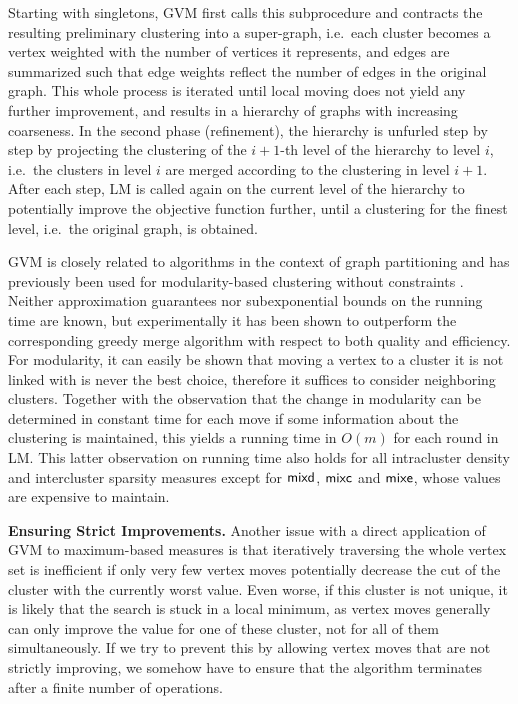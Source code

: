 \documentclass{llncs}
\newcommand{\measure}[1]{\ensuremath{\text{\normalfont{\sffamily {#1}}}}\xspace}
\newcommand{\andreapar}{\vspace*{.5ex}\par\noindent}
\begin{document}
Starting with singletons, GVM first calls this subprocedure and contracts the resulting preliminary clustering into a super-graph, i.e.~each cluster becomes a vertex weighted with the number of vertices it represents, and edges are summarized such that edge weights reflect the number of edges in the original graph.
This whole process is iterated until local moving does not yield any further improvement, and results in a hierarchy of graphs with increasing coarseness.
In the second phase (refinement), the hierarchy is unfurled step by step by projecting the clustering of the $i+1$-th level of the hierarchy to level $i$, i.e.~the clusters in level $i$ are merged according to the clustering in level $i+1$.
After each step, LM is called again on the current level of the hierarchy to potentially improve the objective function further, until a clustering for the finest level, i.e.~the original graph, is obtained.  
\par
GVM is closely related to algorithms in the context of graph partitioning and has previously been used for modularity-based clustering without constraints \cite{bgll-f-08,rn-m-11}. 
Neither approximation guarantees nor subexponential bounds on the running time are known, but experimentally it has been shown to outperform the corresponding greedy merge algorithm with respect to both quality and efficiency.
For modularity, it can easily be shown that moving a vertex to a cluster it is not linked with is never the best choice, therefore it suffices to consider neighboring clusters.
Together with the observation that the change in modularity can be determined in constant time for each move if some information about the clustering is maintained, this yields a running time in $O(m)$ for each round in LM.
This latter observation on running time also holds for all intracluster density and intercluster sparsity measures except for \measure{mixd}, \measure{mixc} and \measure{mixe}, whose values are expensive to maintain.
\andreapar\textbf{Ensuring Strict Improvements.}
Another issue with a direct application of GVM to maximum-based measures is that iteratively traversing the whole vertex set is inefficient if only very few vertex moves potentially decrease the cut of the cluster with the currently worst value.
Even worse, if this cluster is not unique, it is likely that the search is stuck in a local minimum, as vertex moves generally can only improve the value for one of these cluster, not for all of them simultaneously.
If we try to prevent this by allowing vertex moves that are not strictly improving, we somehow have to ensure that the algorithm terminates after a finite number of operations.
\end{document}
